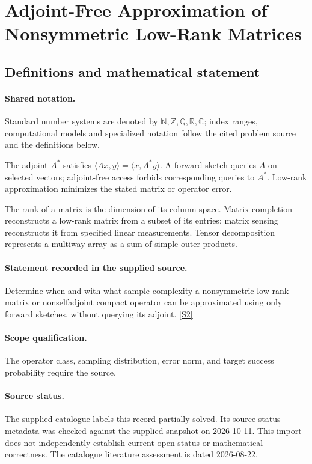 \documentclass[11pt]{article}
\newcommand{\sref}[2]{\hyperlink{source:#1:#2}{[S#2]}}
\begin{document}
\section{Adjoint-Free Approximation of Nonsymmetric Low-Rank Matrices}\label{statement}

\subsection{Definitions and mathematical statement}

\paragraph{Shared notation.}Standard number systems are denoted by $\mathbb N,\mathbb Z,\mathbb Q,\mathbb R,\mathbb C$; index ranges, computational models and specialized notation follow the cited problem source and the definitions below.


The adjoint $A^*$ satisfies $\langle Ax,y\rangle=\langle x,A^*y\rangle$. A forward sketch queries $A$ on selected vectors; adjoint-free access forbids corresponding queries to $A^*$. Low-rank approximation minimizes the stated matrix or operator error.

The rank of a matrix is the dimension of its column space. Matrix completion reconstructs a low-rank matrix from a subset of its entries; matrix sensing reconstructs it from specified linear measurements. Tensor decomposition represents a multiway array as a sum of simple outer products.
\paragraph{Statement recorded in the supplied source.}
Determine when and with what sample complexity a nonsymmetric low-rank matrix or nonselfadjoint compact operator can be approximated using only forward sketches, without querying its adjoint. \sref{statement}{2}
\paragraph{Scope qualification.}
The operator class, sampling distribution, error norm, and target success probability require the source.
\paragraph{Source status.}
The supplied catalogue labels this record partially solved. Its source-status metadata was checked against the supplied snapshot on 2026-10-11. This import does not independently establish current open status or mathematical correctness. The catalogue literature assessment is dated 2026-08-22.
\end{document}
